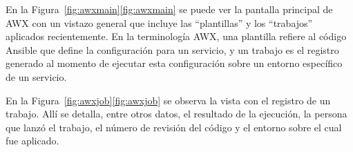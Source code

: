 En la \iflatexml{}Figura~\ref{fig:awxmain}\else\autoref{fig:awxmain}\fi{}
se puede ver la pantalla principal de AWX con un vistazo general que
incluye las ``plantillas'' y los ``trabajos'' aplicados
recientemente. En la terminología AWX, una plantilla refiere al código
Ansible que define la configuración para un servicio, y un trabajo es
el registro generado al momento de ejecutar esta configuración sobre
un entorno específico de un servicio.

En la \iflatexml{}Figura~\ref{fig:awxjob}\else\autoref{fig:awxjob}\fi{}
se observa la vista con el registro de un trabajo. Allí se detalla,
entre otros datos, el resultado de la ejecución, la persona que lanzó
el trabajo, el número de revisión del código y el entorno sobre el
cual fue aplicado.
